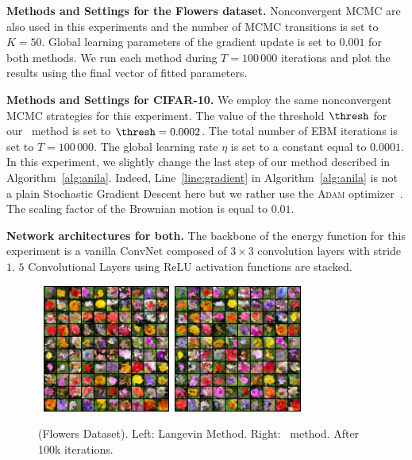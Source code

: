 \documentclass[letterpaper]{article} %
\begin{document}
\medskip
\textbf{Methods and Settings for the Flowers dataset.}
Nonconvergent MCMC are also used in this experiments and the number of MCMC transitions is set to $K = 50$.
Global learning parameters of the gradient update is set to $0.001$ for both methods.
We run each method during $T = 100\,000$ iterations and plot the results using the final vector of fitted parameters.

\medskip
\textbf{Methods and Settings for CIFAR-10.}
We employ the same nonconvergent MCMC strategies for this experiment.
The value of the threshold $\thresh$ for our \algo\ method is set to $\thresh = 0.0002$.
The total number of EBM iterations is set to $T = 100\,000$.
The global learning rate $\eta$ is set to a constant equal to $0.0001$.
In this experiment, we slightly change the last step of our method described in Algorithm~\ref{alg:anila}.
Indeed, Line~\ref{line:gradient} in Algorithm~\ref{alg:anila} is not a plain Stochastic Gradient Descent here but we rather use the \textsc{Adam} optimizer~\cite{KB15}.
The scaling factor of the Brownian motion is equal to $0.01$.



\medskip
\textbf{Network architectures for both.} 
The backbone of the energy function for this experiment is a vanilla ConvNet composed of $3 \times 3$ convolution layers with stride $1$.
$5$ Convolutional Layers using ReLU activation functions are stacked.



\begin{figure}[b!]
\begin{center}
        \mbox{
        \includegraphics[width=1.65in]{figs/flowerslangevin}
        \includegraphics[width=1.65in]{figs/flowersanila}
        }
\end{center}
	\caption{(Flowers Dataset). Left: Langevin Method. Right: \algo\ method. After 100k iterations.}
	\label{fig:flowers}
\end{figure}
\end{document}
